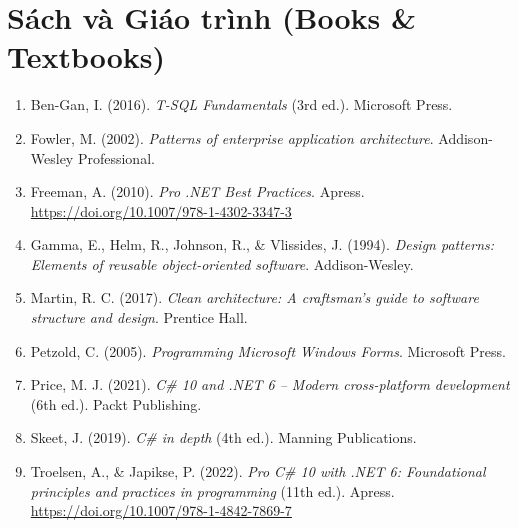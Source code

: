 \documentclass[12pt,a4paper]{report}
\begin{document}
\section*{Sách và Giáo trình (Books \& Textbooks)}
\begin{enumerate}[leftmargin=1.0cm]
    \item Ben-Gan, I. (2016). \textit{T-SQL Fundamentals} (3rd ed.). Microsoft Press.
    \item Fowler, M. (2002). \textit{Patterns of enterprise application architecture}. Addison-Wesley Professional.
    \item Freeman, A. (2010). \textit{Pro .NET Best Practices}. Apress. \url{https://doi.org/10.1007/978-1-4302-3347-3}
    \item Gamma, E., Helm, R., Johnson, R., \& Vlissides, J. (1994). \textit{Design patterns: Elements of reusable object-oriented software}. Addison-Wesley.
    \item Martin, R. C. (2017). \textit{Clean architecture: A craftsman's guide to software structure and design}. Prentice Hall.
    \item Petzold, C. (2005). \textit{Programming Microsoft Windows Forms}. Microsoft Press.
    \item Price, M. J. (2021). \textit{C\# 10 and .NET 6 -- Modern cross-platform development} (6th ed.). Packt Publishing.
    \item Skeet, J. (2019). \textit{C\# in depth} (4th ed.). Manning Publications.
    \item Troelsen, A., \& Japikse, P. (2022). \textit{Pro C\# 10 with .NET 6: Foundational principles and practices in programming} (11th ed.). Apress. \url{https://doi.org/10.1007/978-1-4842-7869-7}
\end{enumerate}
\end{document}
